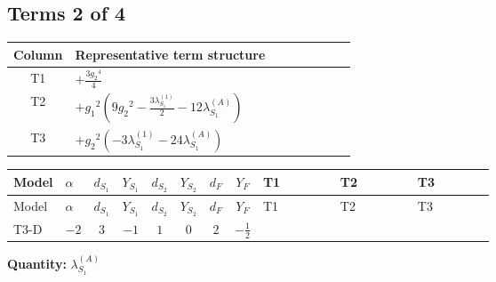 \documentclass[8pt]{article}
\begin{document}
\begin{landscape}
\subsection*{Terms 2 of 4}
\begin{center}
\begin{tabular}{@{}c >{\raggedright\arraybackslash}p{0.82\linewidth}@{}}
\toprule
Column & Representative term structure \\
\midrule
T1 & \(\displaystyle +\frac{3 {g_2}^4}{4}\) \\
\midrule
T2 & \(\displaystyle +{g_1}^2 \left(9 {g_2}^2-\frac{3 {\lambda_{S_1}^{(1)}}}{2}-12 {\lambda_{S_1}^{(A)}}\right)\) \\
\midrule
T3 & \(\displaystyle +{g_2}^2 (-3 {\lambda_{S_1}^{(1)}}-24 {\lambda_{S_1}^{(A)}})\) \\
\midrule
\bottomrule
\end{tabular}
\end{center}
\smallskip
\tiny
\begin{longtable}{@{}llcccccc >{\raggedright\arraybackslash}p{0.21\linewidth} >{\raggedright\arraybackslash}p{0.21\linewidth} >{\raggedright\arraybackslash}p{0.21\linewidth}@{}}
\toprule
Model & $\alpha$ & $d_{S_1}$ & $Y_{S_1}$ & $d_{S_2}$ & $Y_{S_2}$ & $d_F$ & $Y_F$ & T1 & T2 & T3 \\
\midrule
\endfirsthead
\toprule
Model & $\alpha$ & $d_{S_1}$ & $Y_{S_1}$ & $d_{S_2}$ & $Y_{S_2}$ & $d_F$ & $Y_F$ & T1 & T2 & T3 \\
\midrule
\endhead
T3-D & $-2$ & $3$ & $-1$ & $1$ & $0$ & $2$ & $-\frac{1}{2}$ & \scriptsize\adjustbox{max width=\linewidth}{$\begin{gathered} +\frac{3 {g_2}^4}{4}\end{gathered}$} & \scriptsize\adjustbox{max width=\linewidth}{$\begin{gathered} +{g_1}^2 \left(9 {g_2}^2-\frac{3 {\lambda_{S_1}^{(1)}}}{2}-12 {\lambda_{S_1}^{(A)}}\right)\end{gathered}$} & \scriptsize\adjustbox{max width=\linewidth}{$\begin{gathered} +{g_2}^2 (-3 {\lambda_{S_1}^{(1)}}-24 {\lambda_{S_1}^{(A)}})\end{gathered}$} \\
\midrule
\bottomrule
\end{longtable}
\clearpage
\noindent\textbf{Quantity: }$\lambda_{S_1}^{(A)}$\par\smallskip

\end{landscape}
\end{document}

